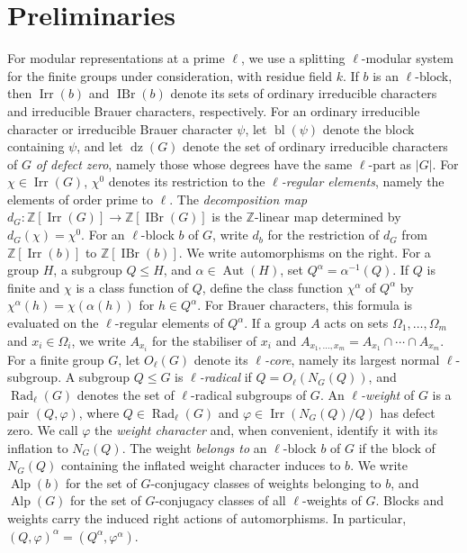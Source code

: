 \documentclass[10pt]{amsart}
\theoremstyle{definition}
\renewcommand{\leq}{\leqslant}
\DeclareMathOperator{\Aut}{Aut}
\DeclareMathOperator{\IBr}{IBr}
\DeclareMathOperator{\Irr}{Irr}
\DeclareMathOperator{\Alp}{Alp}
\DeclareMathOperator{\Rad}{Rad}
\DeclareMathOperator{\dz}{dz}
\DeclareMathOperator{\bl}{bl}
\newcommand{\Z}{\mathbb Z}
\numberwithin{equation}{section}
\numberwithin{table}{section}
\begin{document}
\section{Preliminaries}\label{sec:preliminaries}

For modular representations at a prime $\ell$, we use a splitting
$\ell$-modular system for the finite groups under consideration, with
residue field $k$. If $b$ is an $\ell$-block, then
$\Irr(b)$ and $\IBr(b)$ denote its sets of ordinary irreducible characters
and irreducible Brauer characters, respectively.  For an ordinary irreducible
character or irreducible Brauer character $\psi$, let $\bl(\psi)$ denote the
block containing $\psi$, and let
$\dz(G)$ denote the set of ordinary
irreducible characters of $G$ \emph{of defect zero}, namely those whose
degrees have the same $\ell$-part as $|G|$.
For $\chi\in\Irr(G)$, $\chi^0$ denotes its
restriction to the \emph{$\ell$-regular elements}, namely the elements of order
prime to $\ell$.  The \emph{decomposition map}
$d_G:\Z[\Irr(G)]\longrightarrow\Z[\IBr(G)]$ is the $\Z$-linear map
determined by $d_G(\chi)=\chi^0$. For an $\ell$-block $b$ of $G$, write
$d_b$ for the restriction of $d_G$ from
$\Z[\Irr(b)]$ to $\Z[\IBr(b)]$.
We write automorphisms on the right. For a group $H$, a subgroup
$Q\leq H$, and $\alpha\in\Aut(H)$, set $Q^\alpha=\alpha^{-1}(Q)$.
If $Q$ is finite and $\chi$ is a class function of $Q$, define the class
function $\chi^\alpha$ of $Q^\alpha$ by
$\chi^\alpha(h)=\chi(\alpha(h))$ for $h\in Q^\alpha$.
For Brauer characters, this formula is evaluated on the $\ell$-regular
elements of $Q^\alpha$.
If a group $A$ acts on sets $\Omega_1,\ldots,\Omega_m$ and
$x_i\in\Omega_i$, we write $A_{x_i}$ for the stabiliser of $x_i$ and
$A_{x_1,\ldots,x_m}=A_{x_1}\cap\cdots\cap A_{x_m}$.
For a finite group $G$, let $O_\ell(G)$ denote its \emph{$\ell$-core}, namely
its largest normal $\ell$-subgroup.  A subgroup $Q\leq G$ is
\emph{$\ell$-radical} if
$Q=O_\ell(N_G(Q))$, and $\Rad_\ell(G)$ denotes the set of
$\ell$-radical subgroups of $G$.
An \emph{$\ell$-weight} of $G$ is a pair $(Q,\varphi)$, where
$Q\in\Rad_\ell(G)$ and $\varphi\in\Irr(N_G(Q)/Q)$ has defect zero.  We call
$\varphi$ the \emph{weight character} and, when convenient, identify it with
its inflation to $N_G(Q)$.  The weight \emph{belongs to}
an $\ell$-block $b$ of $G$ if the block of $N_G(Q)$ containing the inflated
weight character induces to $b$.  We write $\Alp(b)$ for the set of $G$-conjugacy classes of weights
belonging to $b$, and $\Alp(G)$ for the set of $G$-conjugacy classes of
all $\ell$-weights of $G$.
Blocks and weights carry the induced right actions of automorphisms.  In
particular, $(Q,\varphi)^\alpha=(Q^\alpha,\varphi^\alpha)$.
\end{document}
